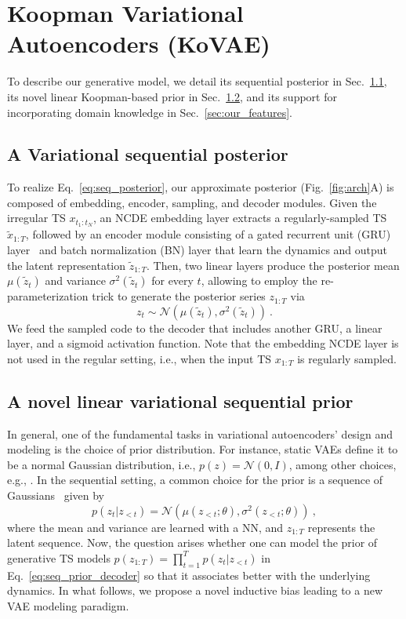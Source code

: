 \documentclass{article} %
\begin{document}
\section{Koopman Variational Autoencoders (KoVAE)}
\label{sec:method}

To describe our generative model, we detail its sequential posterior in Sec.~\ref{sec:our_posterior}, its novel linear Koopman-based prior in Sec.~\ref{sec:our_prior}, and its support for incorporating domain knowledge in Sec.~\ref{sec:our_features}.

\subsection{A Variational sequential posterior}
\label{sec:our_posterior}

To realize Eq.~\ref{eq:seq_posterior}, our approximate posterior (Fig.~\ref{fig:arch}A) is composed of embedding, encoder, sampling, and decoder modules. Given the irregular TS $x_{t_1:t_N}$, an NCDE embedding layer extracts a regularly-sampled TS $\tilde{x}_{1:T}$, followed by an encoder module consisting of a gated recurrent unit (GRU) layer~\citep{cho2014learning} and batch normalization (BN) layer that learn the dynamics and output the latent representation $\tilde{z}_{1:T}$. Then, two linear layers produce the posterior mean $\mu(\tilde{z}_t)$ and variance $\sigma^2(\tilde{z}_t)$ for every $t$, allowing to employ the re-parameterization trick to generate the posterior series $z_{1:T}$ via
\begin{equation}
    z_t \sim \mathcal{N}(\mu(\tilde{z}_t), \sigma^2(\tilde{z}_t)) \ .
\end{equation}
We feed the sampled code to the decoder that includes another GRU, a linear layer, and a sigmoid activation function. Note that the embedding NCDE layer is not used in the regular setting, i.e., when the input TS $x_{1:T}$ is regularly sampled. 

\subsection{A novel linear variational sequential prior}
\label{sec:our_prior}

In general, one of the fundamental tasks in variational autoencoders' design and modeling is the choice of prior distribution. For instance, static VAEs define it to be a normal Gaussian distribution, i.e., $p(z) = \mathcal{N}(0, I)$, among other choices, e.g., \citep{huszar2017variational}. In the sequential setting, a common choice for the prior is a sequence of Gaussians~\citep{chung2015recurrent} given by
\begin{equation} \label{eq:seq_prior}
    p(z_t | z_{< t}) = \mathcal{N}(\mu(z_{<t}; \theta), \sigma^2(z_{<t}; \theta)) \ ,
\end{equation}
where the mean and variance are learned with a NN, and $z_{1:T}$ represents the latent sequence. Now, the question arises whether one can model the prior of generative TS models $p(z_{1:T}) = \prod_{t=1}^T p(z_t | z_{<t})$ in Eq.~\ref{eq:seq_prior_decoder} so that it associates better with the underlying dynamics. In what follows, we propose a novel inductive bias leading to a new VAE modeling paradigm. 
\end{document}
